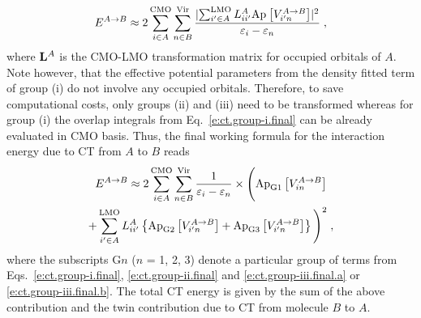 %
\begin{equation} \label{e:ect-oep.prefinal}
 E^{A\rightarrow B} \approx
 2 
 \sum_{i\in A}^{\rm CMO}
 \sum_{n\in B}^{\rm Vir}
 \frac{
 \lvert
   \sum_{i'\in A}^{\rm LMO} L_{ii'}^A
   \Approx{V_{i'n}^{A\rightarrow B}}{} 
 \rvert^2 }{\varepsilon_i - \varepsilon_n} \;,
\end{equation}
%
where ${\bf L}^A$ is the CMO\hyp{}LMO transformation matrix for occupied orbitals of $A$. 
Note however, that the effective potential parameters from the density fitted term of group (i) 
do not involve any occupied orbitals.
Therefore, to save computational costs, only groups (ii) and (iii) need to be transformed
whereas for group (i) the overlap integrals from Eq.~\eqref{e:ct.group-i.final} 
can be already evaluated in CMO basis.
Thus, the final working formula for the interaction energy due to CT from $A$ to $B$ reads
%
\begin{multline} \label{e:ect-oep.final}
 E^{A\rightarrow B} \approx
 2 
 \sum_{i\in A}^{\rm CMO}
 \sum_{n\in B}^{\rm Vir}
 \frac{1}{\varepsilon_i - \varepsilon_n} \times 
 \Bigg(
   \Approx{V_{in}^{A\rightarrow B}}{\rm G1} \\
  +
   \sum_{i'\in A}^{\rm LMO} L_{ii'}^A
   \left\{
   \Approx{V_{i'n}^{A\rightarrow B}}{\rm G2} 
  +\Approx{V_{i'n}^{A\rightarrow B}}{\rm G3}
  \right\}
 \Bigg)^2 \;,
\end{multline}
%
where the subscripts G$n$ ($n$ = 1, 2, 3) denote a particular group of 
terms from Eqs.~\eqref{e:ct.group-i.final}, \eqref{e:ct.group-ii.final} and \eqref{e:ct.group-iii.final.a}
or \eqref{e:ct.group-iii.final.b}. 
The total CT energy is given by the sum of the above contribution and the twin contribution
due to CT from molecule $B$ to $A$.

%
%




